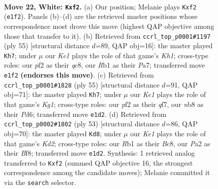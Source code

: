 \documentclass[11pt]{article}
\begin{document}
\clearpage

\begin{figure}[p]\centering
\begin{subfigure}{0.46\textwidth}\centering
\resizebox{\linewidth}{!}{%
\newchessgame
\chessboard[
  setfen={rn5r/8/5p1k/pB1p3p/3P3q/6Q1/PP3pP1/1R2K1N1 w - - 0 22},
  showmover=false,
  pgfstyle=straightmove, color=movearrow, markmove={e1-f2}
]}
\caption{}
\end{subfigure}\hfill
\begin{subfigure}{0.46\textwidth}\centering
\resizebox{\linewidth}{!}{%
\newchessgame
\chessboard[
  setfen={2Q4k/pp3pp1/8/8/2P5/3q2rP/PP2b2K/R3R3 b - - 1 28},
  showmover=false,
  pgfstyle=straightmove, color=movearrow, markmove={h8-h7}
]}
\caption{}
\end{subfigure}
\\[4pt]
\begin{subfigure}{0.46\textwidth}\centering
\resizebox{\linewidth}{!}{%
\newchessgame
\chessboard[
  setfen={2r3k1/1p3Qp1/p2pp3/8/4P2P/2q3P1/P1P5/1K3R2 b - - 3 28},
  showmover=false,
  pgfstyle=straightmove, color=movearrow, markmove={g8-h7}
]}
\caption{}
\end{subfigure}\hfill
\begin{subfigure}{0.46\textwidth}\centering
\resizebox{\linewidth}{!}{%
\newchessgame
\chessboard[
  setfen={2b2br1/3k1p1p/2Qp4/3P1p2/5q2/6P1/PP5P/3R2K1 b - - 5 27},
  showmover=false,
  pgfstyle=straightmove, color=movearrow, markmove={d7-d8}
]}
\caption{}
\end{subfigure}
\caption{\textbf{Move 22, White: \texttt{Kxf2}.} (a) Our position; Melanie plays \texttt{Kxf2} (\texttt{e1f2}). Panels (b)--(d) are the retrieved master positions whose correspondence most drove this move (highest QAP objective among those that transfer to it). (b) Retrieved from \texttt{ccrl\_top\_p0001\#1197} (ply 55) [structural distance $d$=89, QAP obj=16]: the master played \texttt{Kh7}; under $\mu$ our \emph{Ke1} plays the role of that game's \emph{Kh1}; cross-type roles: our \emph{p}f2 as their \emph{q}c8, our \emph{R}b1 as their \emph{P}a7; transferred move \texttt{e1f2} \textbf{(endorses this move)}. (c) Retrieved from \texttt{ccrl\_top\_p0001\#1828} (ply 55) [structural distance $d$=91, QAP obj=71]: the master played \texttt{Kh7}; under $\mu$ our \emph{Ke1} plays the role of that game's \emph{Kg1}; cross-type roles: our \emph{p}f2 as their \emph{q}f7, our \emph{n}b8 as their \emph{P}d6; transferred move \texttt{e1d2}. (d) Retrieved from \texttt{ccrl\_top\_p0002\#1802} (ply 53) [structural distance $d$=86, QAP obj=70]: the master played \texttt{Kd8}; under $\mu$ our \emph{Ke1} plays the role of that game's \emph{Kd2}; cross-type roles: our \emph{R}b1 as their \emph{B}c8, our \emph{P}a2 as their \emph{B}f8; transferred move \texttt{e1d2}. Synthesis: 1 retrieved analog transferred to \texttt{Kxf2} (summed QAP objective 16, the strongest correspondence among the candidate moves); Melanie committed it via the \texttt{search} selector.}
\label{fig:thought-m42}
\end{figure}
\end{document}
